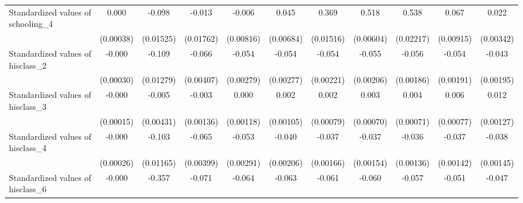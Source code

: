 {\begin{tabular}{l*{10}{c}}
Standardized values of schooling\_4&       0.000         &      -0.098\sym{***}&      -0.013         &      -0.006         &       0.045\sym{***}&       0.369\sym{***}&       0.518\sym{***}&       0.538\sym{***}&       0.067\sym{***}&       0.022\sym{***}\\
                    &   (0.00038)         &   (0.01525)         &   (0.01762)         &   (0.00816)         &   (0.00684)         &   (0.01516)         &   (0.00604)         &   (0.02217)         &   (0.00915)         &   (0.00342)         \\
Standardized values of hisclass\_2&      -0.000         &      -0.109\sym{***}&      -0.066\sym{***}&      -0.054\sym{***}&      -0.054\sym{***}&      -0.054\sym{***}&      -0.055\sym{***}&      -0.056\sym{***}&      -0.054\sym{***}&      -0.043\sym{***}\\
                    &   (0.00030)         &   (0.01279)         &   (0.00407)         &   (0.00279)         &   (0.00277)         &   (0.00221)         &   (0.00206)         &   (0.00186)         &   (0.00191)         &   (0.00195)         \\
Standardized values of hisclass\_3&      -0.000         &      -0.005         &      -0.003         &       0.000         &       0.002\sym{*}  &       0.002\sym{**} &       0.003\sym{***}&       0.004\sym{***}&       0.006\sym{***}&       0.012\sym{***}\\
                    &   (0.00015)         &   (0.00431)         &   (0.00136)         &   (0.00118)         &   (0.00105)         &   (0.00079)         &   (0.00070)         &   (0.00071)         &   (0.00077)         &   (0.00127)         \\
Standardized values of hisclass\_4&      -0.000         &      -0.103\sym{***}&      -0.065\sym{***}&      -0.053\sym{***}&      -0.040\sym{***}&      -0.037\sym{***}&      -0.037\sym{***}&      -0.036\sym{***}&      -0.037\sym{***}&      -0.038\sym{***}\\
                    &   (0.00026)         &   (0.01165)         &   (0.00399)         &   (0.00291)         &   (0.00206)         &   (0.00166)         &   (0.00154)         &   (0.00136)         &   (0.00142)         &   (0.00145)         \\
Standardized values of hisclass\_6&      -0.000         &      -0.357\sym{***}&      -0.071\sym{***}&      -0.064\sym{***}&      -0.063\sym{***}&      -0.061\sym{***}&      -0.060\sym{***}&      -0.057\sym{***}&      -0.051\sym{***}&      -0.047\sym{***}\\

\end{tabular}}
